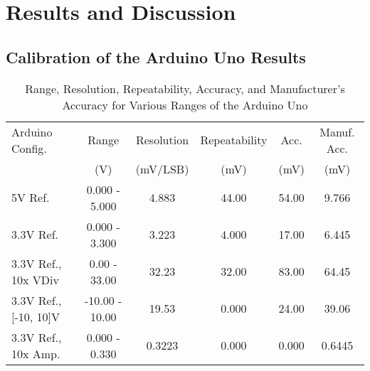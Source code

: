 \section{Results and Discussion}

\subsection{Calibration of the Arduino Uno Results}
\begin{table}[ht]
    \caption{Range, Resolution, Repeatability, Accuracy, and Manufacturer's Accuracy for Various Ranges of the Arduino Uno}
    \label{tab:arduino-accuracy}
    \centering
    \small
    \begin{tabular}{lccccc}
        \toprule
        Arduino Config. & Range & Resolution & Repeatability & Acc. & Manuf. Acc. \\
        & (V) & (mV/LSB) & (mV) & (mV) & (mV) \\
        \midrule
        5V Ref. & 0.000 - 5.000 & 4.883 & 44.00 & 54.00 & 9.766 \\
        3.3V Ref. & 0.000 - 3.300 & 3.223 & 4.000 & 17.00 & 6.445 \\
        3.3V Ref., 10x VDiv & 0.00 - 33.00 & 32.23 & 32.00 & 83.00 & 64.45 \\
        3.3V Ref., [-10, 10]V & -10.00 - 10.00 & 19.53 & 0.000 & 24.00 & 39.06 \\
        3.3V Ref., 10x Amp. & 0.000 - 0.330 & 0.3223 & 0.000 & 0.000 & 0.6445 \\
        \bottomrule
    \end{tabular}
\end{table}
\FloatBarrier

